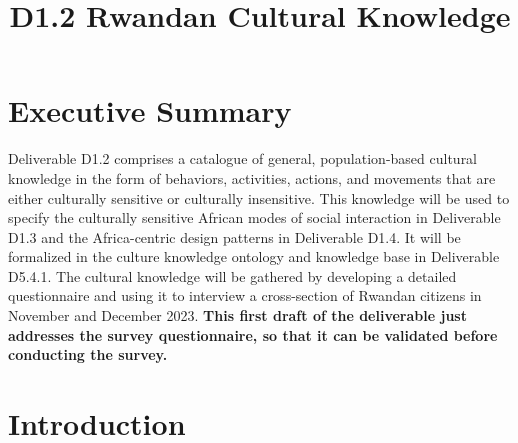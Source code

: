 \documentclass{CSSRforAfrica}
\begin{document}



\title{D1.2 Rwandan Cultural Knowledge}    %

\partner{}                                %




\maketitle
 

\section*{Executive Summary}
\label{executive_summary}
 
Deliverable D1.2  comprises a catalogue of general, population-based cultural knowledge in the form of behaviors, activities, actions, and movements that are either culturally sensitive or culturally insensitive. This knowledge will be used to specify the culturally sensitive African modes of social interaction in Deliverable D1.3 and the Africa-centric design patterns in Deliverable D1.4. It will be formalized in the culture knowledge ontology and knowledge base in Deliverable D5.4.1.  The cultural knowledge will be gathered by developing a detailed questionnaire and using it  to interview a cross-section of Rwandan citizens in November and December 2023.
{\bf This first draft of the deliverable just addresses the survey questionnaire, so that it can be validated before conducting the survey.}

\newpage

 
\pagebreak
\tableofcontents
\newpage


\section{Introduction}
 
\end{document}
